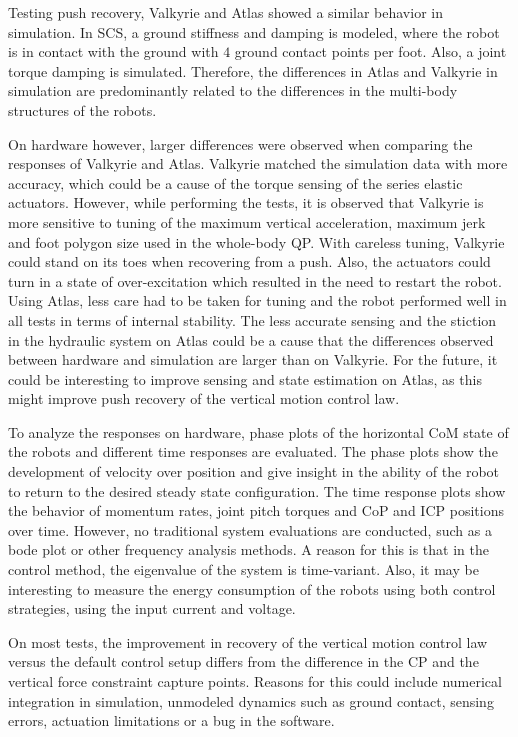 Testing push recovery, Valkyrie and Atlas showed a similar behavior in simulation. In \ac{SCS}, a ground stiffness and damping is modeled, where the robot is in contact with the ground with $4$ ground contact points per foot. Also, a joint torque damping is simulated. Therefore, the differences in Atlas and Valkyrie in simulation are predominantly related to the differences in the multi-body structures of the robots.

On hardware however, larger differences were observed when comparing the responses of Valkyrie and Atlas. Valkyrie matched the simulation data with more accuracy, which could be a cause of the torque sensing of the series elastic actuators. However, while performing the tests, it is observed that Valkyrie is more sensitive to tuning of the maximum vertical acceleration, maximum jerk and foot polygon size used in the whole-body \ac{QP}. With careless tuning, Valkyrie could stand on its toes when recovering from a push. Also, the actuators could turn in a state of over-excitation which resulted in the need to restart the robot. Using Atlas, less care had to be taken for tuning and the robot performed well in all tests in terms of internal stability. The less accurate sensing and the stiction in the hydraulic system on Atlas could be a cause that the differences observed between hardware and simulation are larger than on Valkyrie. For the future, it could be interesting to improve sensing and state estimation on Atlas, as this might improve push recovery of the vertical motion control law.

To analyze the responses on hardware, phase plots of the horizontal \ac{CoM} state of the robots and different time responses are evaluated. The phase plots show the development of velocity over position and give insight in the ability of the robot to return to the desired steady state configuration. The time response plots show the behavior of momentum rates, joint pitch torques and \ac{CoP} and \ac{ICP} positions over time. However, no traditional system evaluations are conducted, such as a bode plot or other frequency analysis methods. A reason for this is that in the control method, the eigenvalue of the system is time-variant. Also, it may be interesting to measure the energy consumption of the robots using both control strategies, using the input current and voltage.

On most tests, the improvement in recovery of the vertical motion control law versus the default control setup differs  from the difference in the \ac{CP} and the vertical force constraint capture points. Reasons for this could include numerical integration in simulation, unmodeled dynamics such as ground contact, sensing errors, actuation limitations or a bug in the software.

